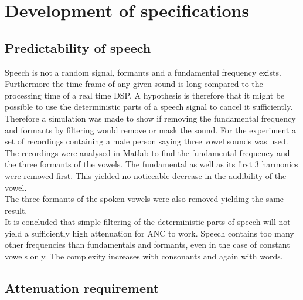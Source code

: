 

\section{Development of specifications}
\subsection{Predictability of speech}
Speech is not a random signal, formants and a fundamental frequency exists. Furthermore the time frame of any given sound is long compared to the processing time of a real time DSP. A hypothesis is therefore that it might be possible to use the deterministic parts of a speech signal to cancel it sufficiently. \\
Therefore a simulation was made to show if removing the fundamental frequency and formants by filtering would remove or mask the sound. For the experiment a set of recordings containing a male person saying three vowel sounds was used. \\
The recordings were analysed in Matlab to find the fundamental frequency and the three formants of the vowels. The fundamental as well as its first 3 harmonics were removed first. This yielded no noticeable decrease in the audibility of the vowel.\\
The three formants of the spoken vowels were also removed yielding the same result.\\
It is concluded that simple filtering of the deterministic parts of speech will not yield a sufficiently high attenuation for ANC to work. Speech contains too many other frequencies than fundamentals and formants, even in the case of constant vowels only. The complexity increases with consonants and again with words. 
\subsection{Attenuation requirement}